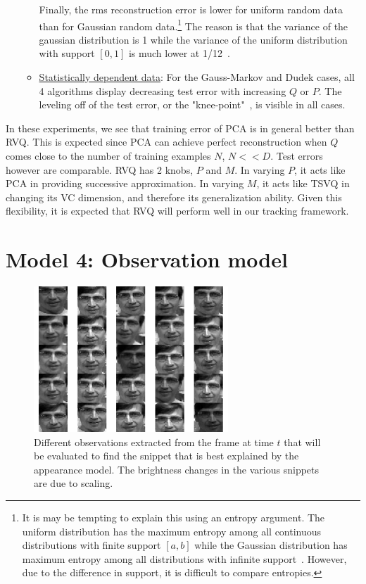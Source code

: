 \begin{enumerate}
\begin{itemize}
Finally, the rms reconstruction error is lower for uniform random data than for Gaussian random data.\footnote{It is may be tempting to explain this using an entropy argument.  The uniform distribution has the maximum entropy among all continuous distributions with finite support $[a,b]$ while the Gaussian distribution has maximum entropy among all distributions with infinite support~\cite{1982_JNL_MaxEntropy_Jaynes}.  However, due to the difference in support, it is difficult to compare entropies.} The reason is that the variance of the gaussian distribution is 1 while the variance of the uniform distribution with support $[0,1]$ is much lower at 1/12~\cite{1993_BOOK_RandomProcesses_Garcia}.
\item \underline{Statistically dependent data}: For the Gauss-Markov and Dudek cases, all 4 algorithms display decreasing test error with increasing $Q$ or $P$. The leveling off of the test error, or the "knee-point"~\cite{2009_BOOK_PRML_Escolano}, is visible in all cases.
\end{itemize}
\end{enumerate}
In these experiments, we see that training error of PCA is in general better than RVQ. This is expected since PCA can achieve perfect reconstruction when $Q$ comes close to the number of training examples $N$, $N<<D$.  Test errors however are comparable.  RVQ has 2 knobs, $P$ and $M$. In varying $P$, it acts like PCA in providing successive approximation. In varying $M$, it acts like TSVQ in changing its VC dimension, and therefore its generalization ability.  Given this flexibility, it is expected that RVQ will perform well in our tracking framework.



\section{Model 4: Observation model}
								\begin{figure}[t]
								\centering
								\includegraphics[width=0.65\textwidth]{thesis/affineCandidates.pdf}
								\caption{Different observations extracted from the frame at time $t$ that will be evaluated to find the snippet that is best explained by the appearance model.  The brightness changes in the various snippets are due to scaling.}
								\label{Fig:affine_candidates}
								\end{figure}

